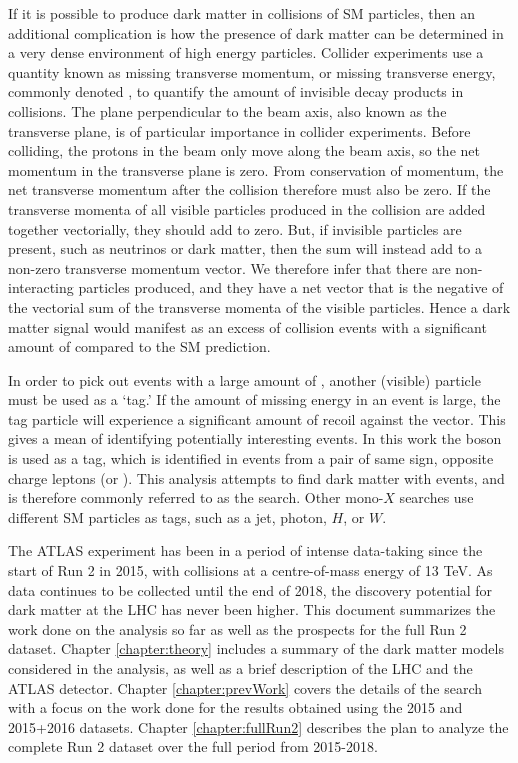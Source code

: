If it is possible to produce dark matter in collisions of SM particles, then an additional complication is how the presence of dark matter can be determined in a very dense environment of high energy particles. Collider experiments use a quantity known as missing transverse momentum, or missing transverse energy, commonly denoted \etmiss, to quantify the amount of invisible decay products in collisions. The plane perpendicular to the beam axis, also known as the transverse plane, is of particular importance in collider experiments. Before colliding, the protons in the beam only move along the beam axis, so the net momentum in the transverse plane is zero. From conservation of momentum, the net transverse momentum after the collision therefore must also be zero. If the transverse momenta of all visible particles produced in the collision are added together vectorially, they should add to zero. But, if invisible particles are present, such as neutrinos or dark matter, then the sum will instead add to a non-zero transverse momentum vector. We therefore infer that there are non-interacting particles produced, and they have a net \etmiss vector that is the negative of the vectorial sum of the transverse momenta of the visible particles. Hence a dark matter signal would manifest as an excess of collision events with a significant amount of \etmiss compared to the SM prediction.

In order to pick out events with a large amount of \etmiss, another (visible) particle must be used as a `tag.' If the amount of missing energy in an event is large, the tag particle will experience a significant amount of recoil against the \etmiss vector. This gives a mean of identifying potentially interesting events. In this work the \Z boson is used as a tag, which is identified in events from a pair of same sign, opposite charge leptons (\epem or \mpmm). This analysis attempts to find dark matter with \Zlletmiss events, and is therefore commonly referred to as the \monoZll search. Other mono-$X$ searches use different SM particles as tags, such as a jet, photon, $H$, or $W$.

The ATLAS experiment has been in a period of intense data-taking since the start of Run 2 in 2015, with \pp collisions at a centre-of-mass energy of 13 TeV. As data continues to be collected until the end of 2018, the discovery potential for dark matter at the LHC has never been higher. This document summarizes the work done on the \monoZll analysis so far as well as the prospects for the full Run 2 dataset. Chapter \ref{chapter:theory} includes a summary of the dark matter models considered in the analysis, as well as a brief description of the LHC and the ATLAS detector. Chapter \ref{chapter:prevWork} covers the details of the search with a focus on the work done for the results obtained using the 2015 and 2015+2016 datasets. Chapter \ref{chapter:fullRun2} describes the plan to analyze the complete Run 2 dataset over the full period from 2015-2018.


